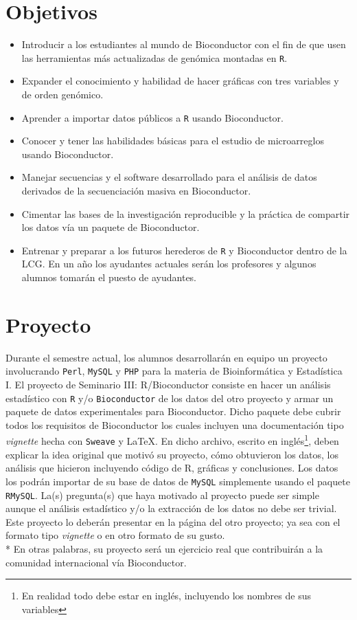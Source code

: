 \documentclass[letterpaper,12pt]{article}
\newcommand{\pl}[1]{\texttt{#1}}
\begin{document}
\section{Objetivos}
  \begin{itemize}
  \item Introducir a los estudiantes al mundo de Bioconductor con el fin de que usen las herramientas más actualizadas de genómica montadas en \pl{R}.
  \item Expander el conocimiento y habilidad de hacer gráficas con tres variables y de orden genómico.
  \item Aprender a importar datos públicos a \pl{R} usando Bioconductor.
  \item Conocer y tener las habilidades básicas para el estudio de microarreglos usando Bioconductor.
  \item Manejar secuencias y el software desarrollado para el análisis de datos derivados de la secuenciación masiva en Bioconductor.
  \item Cimentar las bases de la investigación reproducible y la práctica de compartir los datos vía un paquete de Bioconductor.
  \item Entrenar y preparar a los futuros herederos de \pl{R} y Bioconductor dentro de la LCG. En un año los ayudantes actuales serán los profesores y algunos alumnos tomarán el puesto de ayudantes.
  \end{itemize}

\section{Proyecto}
Durante el semestre actual, los alumnos desarrollarán en equipo un proyecto involucrando \pl{Perl}, \pl{MySQL} y \pl{PHP} para la materia de Bioinformática y Estadística I. El proyecto de Seminario III: R/Bioconductor consiste en hacer un análisis estadístico con \pl{R} y/o \pl{Bioconductor} de los datos del otro proyecto y armar un paquete de datos experimentales para Bioconductor. Dicho paquete debe cubrir todos los requisitos de Bioconductor los cuales incluyen una documentación tipo \emph{vignette} hecha con \pl{Sweave} y \LaTeX. En dicho archivo, escrito en inglés\footnote{En realidad todo debe estar en inglés, incluyendo los nombres de sus variables}, deben explicar la idea original que motivó su proyecto, cómo obtuvieron los datos, los análisis que hicieron incluyendo código de R, gráficas y conclusiones. Los datos los podrán importar de su base de datos de \pl{MySQL} simplemente usando el paquete \pl{RMySQL}. La(s) pregunta(s) que haya motivado al proyecto puede ser simple aunque el análisis estadístico y/o la extracción de los datos no debe ser trivial. Este proyecto lo deberán presentar en la página del otro proyecto; ya sea con el formato tipo \emph{vignette} o en otro formato de su gusto.
\\* \indent En otras palabras, su proyecto será un ejercicio real que contribuirán a la comunidad internacional vía Bioconductor.
\end{document}
